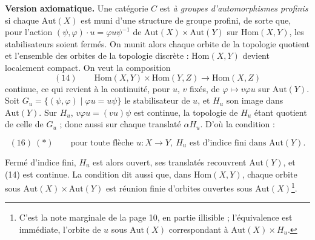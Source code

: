 \documentclass[11pt,a4paper]{article}
\begin{document}
\textbf{Version axiomatique.} Une catégorie $C$ est \emph{à groupes
d'automorphismes profinis} si chaque $\mathrm{Aut}(X)$ est muni d'une
structure de groupe profini, de sorte que, pour l'action
$(\psi, \varphi) \cdot u = \varphi u \psi^{-1}$ de $\mathrm{Aut}(X) \times
\mathrm{Aut}(Y)$ sur $\mathrm{Hom}(X, Y)$, les stabilisateurs soient fermés.
On munit alors chaque orbite de la topologie quotient et l'ensemble des
orbites de la topologie discrète : $\mathrm{Hom}(X, Y)$ devient localement
compact. On veut la composition
\[
(14)\qquad \mathrm{Hom}(X, Y) \times \mathrm{Hom}(Y, Z) \longrightarrow \mathrm{Hom}(X, Z)
\]
continue, ce qui revient à la continuité, pour $u$, $v$ fixés, de
$\varphi \mapsto v \varphi u$ sur $\mathrm{Aut}(Y)$. Soit $G_u = \{(\psi,
\varphi) \mid \varphi u = u \psi\}$ le stabilisateur de $u$, et $H_u$ son
image dans $\mathrm{Aut}(Y)$. Sur $H_u$, $v \varphi u = (v u)\psi$ est
continue, la topologie de $H_u$ étant quotient de celle de $G_u$ ; donc aussi
sur chaque translaté $\alpha H_u$. D'où la condition :

\[
(16)\ (*)\qquad \text{pour toute flèche } u : X \to Y,\ H_u \text{ est d'indice fini dans } \mathrm{Aut}(Y).
\]

Fermé d'indice fini, $H_u$ est alors ouvert, ses translatés recouvrent
$\mathrm{Aut}(Y)$, et (14) est continue. La condition dit aussi que, dans
$\mathrm{Hom}(X, Y)$, chaque orbite sous $\mathrm{Aut}(X) \times
\mathrm{Aut}(Y)$ est réunion finie d'orbites ouvertes sous
$\mathrm{Aut}(X)$\footnote{C'est la note marginale de la page 10, en partie
illisible ; l'équivalence est immédiate, l'orbite de $u$ sous
$\mathrm{Aut}(X)$ correspondant à $\mathrm{Aut}(X) \times H_u$.}.
\end{document}
